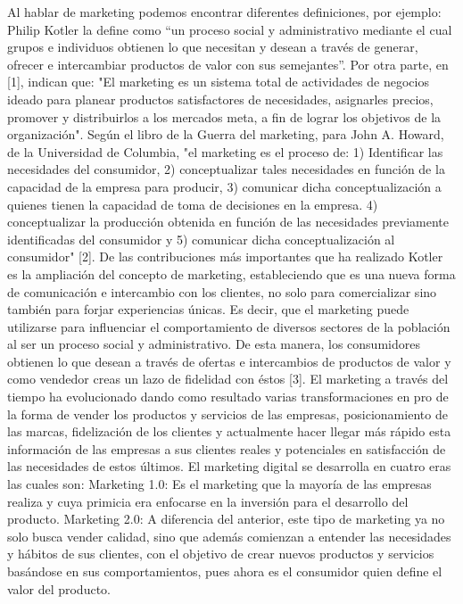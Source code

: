 \documentclass[12pt]{difu100cia} %
\begin{document}
Al hablar de marketing podemos encontrar diferentes definiciones, por ejemplo: Philip Kotler la define como {“un proceso social y administrativo mediante el cual grupos e individuos obtienen lo que necesitan y desean a través de generar, ofrecer e intercambiar productos de valor con sus semejantes”.}
Por otra parte, en [1], indican que: {"El marketing es un sistema total de actividades de negocios ideado para planear productos satisfactores de necesidades, asignarles precios, promover y distribuirlos a los mercados meta, a fin de lograr los objetivos de la organización".}
Según el libro de la Guerra del marketing, para John A. Howard, de la Universidad de Columbia, "el marketing es el proceso de: 1) Identificar las necesidades del consumidor, 2) conceptualizar tales necesidades en función de la capacidad de la empresa para producir, 3) comunicar dicha conceptualización a quienes tienen la capacidad de toma de decisiones en la empresa. 4) conceptualizar la producción obtenida en función de las necesidades previamente identificadas del consumidor y 5) comunicar dicha conceptualización al consumidor" [2].
De las contribuciones más importantes que ha realizado Kotler es la ampliación del concepto de marketing, estableciendo que es una nueva forma de comunicación e intercambio con los clientes, no solo para comercializar sino también para forjar experiencias únicas. Es decir, que el marketing puede utilizarse para influenciar el comportamiento de diversos sectores de la población al ser un proceso social y administrativo. De esta manera, los consumidores obtienen lo que desean a través de ofertas e intercambios de productos de valor y como vendedor creas un lazo de fidelidad con éstos [3].  
El marketing a través del tiempo ha evolucionado dando como resultado varias transformaciones en pro de la forma de vender los productos y servicios de las empresas, posicionamiento de las marcas, fidelización de los clientes y actualmente hacer llegar más rápido esta información de las empresas a sus clientes reales y potenciales en satisfacción de las necesidades de estos últimos.
El marketing digital se desarrolla en cuatro eras las cuales son:
Marketing 1.0: Es el marketing que la mayoría de las empresas realiza y cuya primicia era enfocarse en la inversión para el desarrollo del producto. 
Marketing 2.0: A diferencia del anterior, este tipo de marketing ya no solo busca vender calidad, sino que además comienzan a entender las necesidades y hábitos de sus clientes, con el objetivo de crear nuevos productos y servicios basándose en sus comportamientos, pues ahora es el consumidor quien define el valor del producto. 
\end{document}
